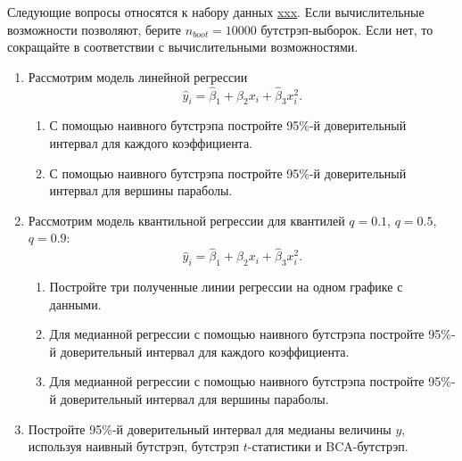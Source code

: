 \documentclass[12pt]{article}
\begin{document}
Следующие вопросы относятся к набору данных \url{xxx}. 
Если вычислительные возможности позволяют, берите $n_{boot}=10000$ бутстрэп-выборок. 
Если нет, то сокращайте в соответствии с вычислительными возможностями. 

\begin{enumerate}[resume]
    \item Рассмотрим модель линейной регрессии 
    \[
    \hat y_i = \hat \beta_1 + \hat\beta_2 x_i + \hat\beta_3 x_i^2.
    \]
    \begin{enumerate}
    \item С помощью наивного бутстрэпа постройте 95\%-й доверительный интервал для каждого коэффициента.
    \item С помощью наивного бутстрэпа постройте 95\%-й доверительный интервал для вершины параболы. 
    \end{enumerate}
\item Рассмотрим модель квантильной регрессии для квантилей $q=0.1$, $q=0.5$, $q=0.9$:
    \[
    \hat y_i = \hat \beta_1 + \hat\beta_2 x_i + \hat\beta_3 x_i^2.
    \]
    \begin{enumerate}
    \item Постройте три полученные линии регрессии на одном графике с данными. 
    \item Для медианной регрессии с помощью наивного бутстрэпа постройте 95\%-й доверительный интервал для каждого коэффициента.
    \item Для медианной регрессии с помощью наивного бутстрэпа постройте 95\%-й доверительный интервал для вершины параболы. 
    \end{enumerate}
\item Постройте 95\%-й доверительный интервал для медианы величины $y$, используя наивный бутстрэп, бутстрэп $t$-статистики и BCA-бутстрэп. 


\end{enumerate}
\end{document}
